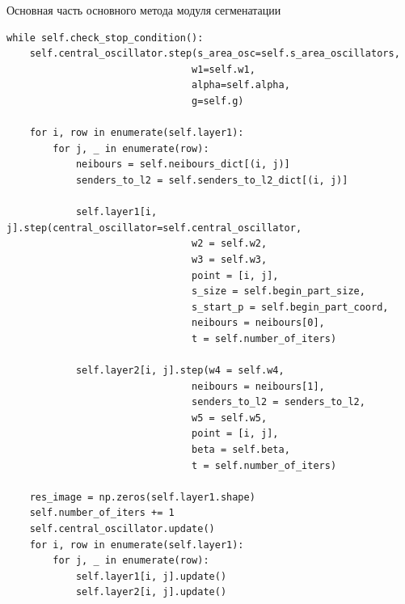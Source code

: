 \documentclass[14pt, russian]{scrartcl}
\begin{document}
\begin{listing}[H]
    \caption{Основная часть основного метода модуля сегменатации}
    \label{lst:contour_extr_sobel}
    \begin{verbatim}
while self.check_stop_condition():
    self.central_oscillator.step(s_area_osc=self.s_area_oscillators, 
                                w1=self.w1, 
                                alpha=self.alpha,
                                g=self.g)

    for i, row in enumerate(self.layer1):
        for j, _ in enumerate(row):
            neibours = self.neibours_dict[(i, j)]
            senders_to_l2 = self.senders_to_l2_dict[(i, j)]

            self.layer1[i, j].step(central_oscillator=self.central_oscillator, 
                                w2 = self.w2, 
                                w3 = self.w3, 
                                point = [i, j], 
                                s_size = self.begin_part_size,
                                s_start_p = self.begin_part_coord,
                                neibours = neibours[0],
                                t = self.number_of_iters)
            
            self.layer2[i, j].step(w4 = self.w4,
                                neibours = neibours[1],
                                senders_to_l2 = senders_to_l2, 
                                w5 = self.w5,
                                point = [i, j],
                                beta = self.beta,
                                t = self.number_of_iters)
            
    res_image = np.zeros(self.layer1.shape)
    self.number_of_iters += 1
    self.central_oscillator.update()
    for i, row in enumerate(self.layer1):
        for j, _ in enumerate(row):
            self.layer1[i, j].update()
            self.layer2[i, j].update()
    \end{verbatim}
\end{listing}
\end{document}
